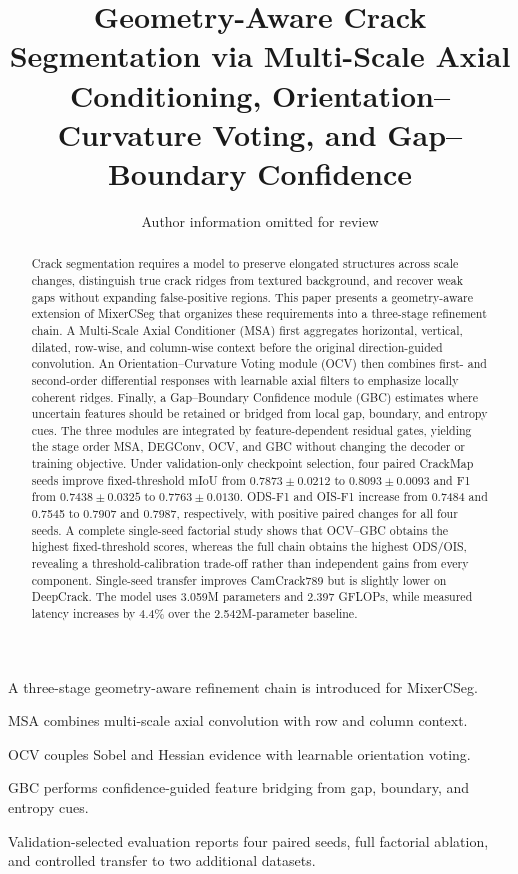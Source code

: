 \documentclass[preprint,12pt]{elsarticle}
\begin{document}
\begin{frontmatter}

\title{Geometry-Aware Crack Segmentation via Multi-Scale Axial Conditioning, Orientation--Curvature Voting, and Gap--Boundary Confidence}

\author[inst1]{Author information omitted for review}

\begin{abstract}
Crack segmentation requires a model to preserve elongated structures across scale changes, distinguish true crack ridges from textured background, and recover weak gaps without expanding false-positive regions. This paper presents a geometry-aware extension of MixerCSeg that organizes these requirements into a three-stage refinement chain. A Multi-Scale Axial Conditioner (MSA) first aggregates horizontal, vertical, dilated, row-wise, and column-wise context before the original direction-guided convolution. An Orientation--Curvature Voting module (OCV) then combines first- and second-order differential responses with learnable axial filters to emphasize locally coherent ridges. Finally, a Gap--Boundary Confidence module (GBC) estimates where uncertain features should be retained or bridged from local gap, boundary, and entropy cues. The three modules are integrated by feature-dependent residual gates, yielding the stage order MSA, DEGConv, OCV, and GBC without changing the decoder or training objective. Under validation-only checkpoint selection, four paired CrackMap seeds improve fixed-threshold mIoU from $0.7873\pm0.0212$ to $0.8093\pm0.0093$ and F1 from $0.7438\pm0.0325$ to $0.7763\pm0.0130$. ODS-F1 and OIS-F1 increase from 0.7484 and 0.7545 to 0.7907 and 0.7987, respectively, with positive paired changes for all four seeds. A complete single-seed factorial study shows that OCV--GBC obtains the highest fixed-threshold scores, whereas the full chain obtains the highest ODS/OIS, revealing a threshold-calibration trade-off rather than independent gains from every component. Single-seed transfer improves CamCrack789 but is slightly lower on DeepCrack. The model uses 3.059M parameters and 2.397 GFLOPs, while measured latency increases by 4.4\% over the 2.542M-parameter baseline.
\end{abstract}

\begin{highlights}
\item A three-stage geometry-aware refinement chain is introduced for MixerCSeg.
\item MSA combines multi-scale axial convolution with row and column context.
\item OCV couples Sobel and Hessian evidence with learnable orientation voting.
\item GBC performs confidence-guided feature bridging from gap, boundary, and entropy cues.
\item Validation-selected evaluation reports four paired seeds, full factorial ablation, and controlled transfer to two additional datasets.
\end{highlights}


\end{frontmatter}
\end{document}
